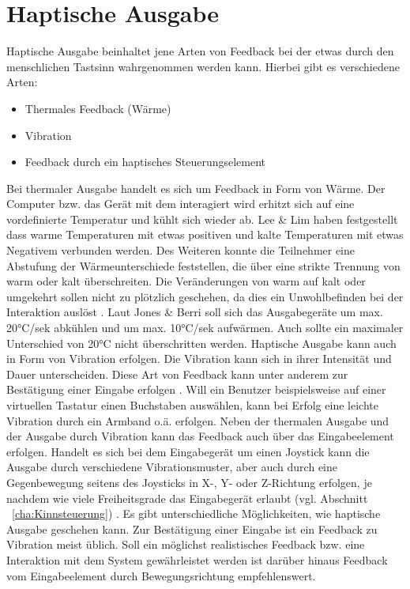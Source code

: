 \section{Haptische Ausgabe}
Haptische Ausgabe beinhaltet jene Arten von Feedback bei der etwas durch den menschlichen Tastsinn wahrgenommen werden kann. Hierbei gibt es verschiedene Arten:
%
%
\begin{itemize}
      \item Thermales Feedback (Wärme)
      \item Vibration
			\item Feedback durch ein haptisches Steuerungselement
\end{itemize}
\vspace{\baselineskip}
%
%
Bei thermaler Ausgabe handelt es sich um Feedback in Form von Wärme. Der Computer bzw. das Gerät mit dem interagiert wird erhitzt sich auf eine vordefinierte Temperatur und kühlt sich wieder ab. Lee & Lim \cite{LeeLim} haben festgestellt dass warme Temperaturen mit etwas positiven und kalte Temperaturen mit etwas Negativem verbunden werden. Des Weiteren konnte die Teilnehmer eine Abstufung der Wärmeunterschiede feststellen, die über eine strikte Trennung von warm oder kalt überschreiten. Die Veränderungen von warm auf kalt oder umgekehrt sollen nicht zu plötzlich geschehen, da dies ein Unwohlbefinden bei der Interaktion auslöst \cite{LeeLim}. \newline
Laut Jones & Berri \cite{JonesBerris} soll sich das Ausgabegeräte um max. 20°C/sek abkühlen und um max. 10°C/sek aufwärmen. Auch sollte ein maximaler Unterschied von 20°C nicht überschritten werden.
\newline \newline
Haptische Ausgabe kann auch in Form von Vibration erfolgen. Die Vibration kann sich in ihrer Intensität und Dauer unterscheiden. Diese Art von Feedback kann unter anderem zur Bestätigung einer Eingabe erfolgen \cite{Vibration}. Will ein Benutzer beispielsweise auf einer virtuellen Tastatur einen Buchstaben auswählen, kann bei Erfolg eine leichte Vibration durch ein Armband o.ä. erfolgen.
\newline \newline
Neben der thermalen Ausgabe und der Ausgabe durch Vibration kann das Feedback auch über das Eingabeelement erfolgen. Handelt es sich bei dem Eingabegerät um einen Joystick kann die Ausgabe durch verschiedene Vibrationsmuster, aber auch durch eine Gegenbewegung seitens des Joysticks in X-, Y- oder Z-Richtung erfolgen, je nachdem wie viele Freiheitsgrade das Eingabegerät erlaubt (vgl. Abschnitt ~\ref{cha:Kinnsteuerung}) \cite{an2002haptic}. 
\newline \newline
Es gibt unterschiedliche Möglichkeiten, wie haptische Ausgabe geschehen kann. Zur Bestätigung einer Eingabe ist ein Feedback zu Vibration meist üblich. Soll ein möglichst realistisches Feedback bzw. eine Interaktion mit dem System gewährleistet werden ist darüber hinaus Feedback vom Eingabeelement durch Bewegungsrichtung empfehlenswert.  
\newpage
